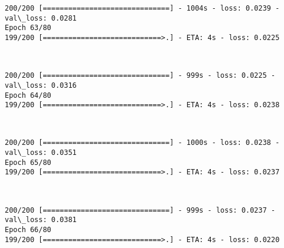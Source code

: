 \documentclass[11pt]{article}
\begin{document}
    \begin{Verbatim}[commandchars=\\\{\}]
200/200 [==============================] - 1004s - loss: 0.0239 - val\_loss: 0.0281
Epoch 63/80
199/200 [============================>.] - ETA: 4s - loss: 0.0225
    \end{Verbatim}

    \begin{center}
    \end{center}
    { \hspace*{\fill} \\}
    
    \begin{Verbatim}[commandchars=\\\{\}]
200/200 [==============================] - 999s - loss: 0.0225 - val\_loss: 0.0316
Epoch 64/80
199/200 [============================>.] - ETA: 4s - loss: 0.0238
    \end{Verbatim}

    \begin{center}
    \end{center}
    { \hspace*{\fill} \\}
    
    \begin{Verbatim}[commandchars=\\\{\}]
200/200 [==============================] - 1000s - loss: 0.0238 - val\_loss: 0.0351
Epoch 65/80
199/200 [============================>.] - ETA: 4s - loss: 0.0237
    \end{Verbatim}

    \begin{center}
    \end{center}
    { \hspace*{\fill} \\}
    
    \begin{Verbatim}[commandchars=\\\{\}]
200/200 [==============================] - 999s - loss: 0.0237 - val\_loss: 0.0381
Epoch 66/80
199/200 [============================>.] - ETA: 4s - loss: 0.0220
    \end{Verbatim}

    \begin{center}
    \end{center}
    { \hspace*{\fill} \\}
    
\end{document}

